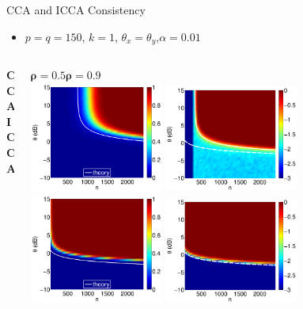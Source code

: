 \documentclass[8pt]{beamer}
\begin{document}
\begin{frame}{CCA and ICCA Consistency}
  \begin{itemize}
  \item $p=q=150$, $k=1$, $\theta_x=\theta_y$,$\alpha=0.01$
  \end{itemize}

  \begin{columns}[T]
  \begin{column}{0.01\textwidth}
    \vspace{15ex}
    \textbf{ CCA}\\
    \vspace{20ex}
    \textbf{ICCA}
  \end{column}
  \begin{column}{1\textwidth}
    \begin{center}
      $\boldsymbol{\rho=}\mathbf{0.5}$\hspace{25ex}$\boldsymbol{\rho=0.9}$\\[0.5ex]

        \includegraphics[width=0.35\textwidth]{figures/cca_rho5.pdf}\hspace{2ex}
        \includegraphics[width=0.35\textwidth]{figures/cca_rho9.pdf}\\[2ex]
        \includegraphics[width=0.35\textwidth]{figures/icca_rho5.pdf}\hspace{2ex}
        \includegraphics[width=0.35\textwidth]{figures/icca_rho9.pdf}
    \end{center}


\end{column}
\end{columns}
\end{frame}
\end{document}
